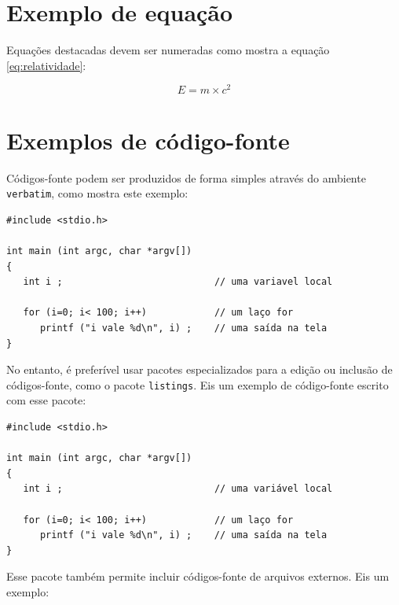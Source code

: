 
\section{Exemplo de equação}

Equações destacadas devem ser numeradas como mostra a equação \ref{eq:relatividade}:

\begin{equation}
E = m \times c^2
\label{eq:relatividade}
\end{equation}


\section{Exemplos de código-fonte}

Códigos-fonte podem ser produzidos de forma simples através do ambiente \texttt{verbatim}, como mostra este exemplo:

\begin{footnotesize}
\begin{verbatim}
#include <stdio.h>

int main (int argc, char *argv[])
{
   int i ;                           // uma variavel local

   for (i=0; i< 100; i++)            // um laço for
      printf ("i vale %d\n", i) ;    // uma saída na tela
}
\end{verbatim}
\end{footnotesize}

No entanto, é preferível usar pacotes especializados para a edição ou inclusão de códigos-fonte, como o pacote \texttt{listings}. Eis um exemplo de código-fonte escrito com esse pacote:


\begin{lstlisting}
#include <stdio.h>

int main (int argc, char *argv[])
{
   int i ;                           // uma variável local

   for (i=0; i< 100; i++)            // um laço for
      printf ("i vale %d\n", i) ;    // uma saída na tela
}
\end{lstlisting}

Esse pacote também permite incluir códigos-fonte de arquivos externos. Eis um exemplo:

